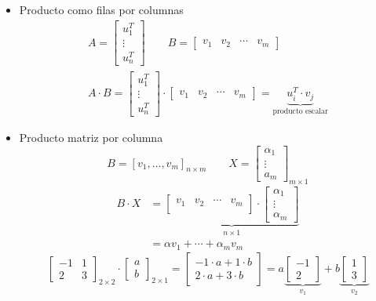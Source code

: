 \begin{itemize}[label=\color{lightblue}$-$, leftmargin=*]
	\item Producto como filas por columnas
	\[ \begin{array}{l}
		A= \begin{bmatrix}
		u_1^T\\
		\vdots\\
		u_n^T
	\end{bmatrix}\qquad B=\begin{bmatrix}
	v_1 & v_2 & \cdots & v_m
	\end{bmatrix}\\
	A\cdot B=\begin{bmatrix}
		u_1^T\\
		\vdots\\
		u_n^T
	\end{bmatrix}\cdot\begin{bmatrix}
	v_1 & v_2 & \cdots & v_m
	\end{bmatrix}=\underbrace{u_i^T\cdot v_j}_{\text{producto escalar}}
	\end{array}\]
	\item Producto matriz por columna
	\[ B=[v_1,\dots,v_m]_{n\times m}\qquad X=\begin{bmatrix}
		\alpha_1\\
		\vdots\\
		a_{m}
	\end{bmatrix}_{m\times 1} \]
	\[ \begin{aligned}
		B\cdot X & =\underbrace{
				 \begin{bmatrix}
				 	v_1 & v_2 & \cdots & v_m\\
				 \end{bmatrix}
				 \cdot\begin{bmatrix}
			\alpha_1\\
			\vdots\\
			\alpha_m
		\end{bmatrix}}_{n\times 1}\\
	& =\alpha v_1+\cdots+\alpha_mv_m
	\end{aligned} \]
	\[ \begin{bmatrix}
		-1 & 1\\
		2 & 3
	\end{bmatrix}_{2\times2}\cdot\begin{bmatrix}
	a\\
	b
	\end{bmatrix}_{2\times1}=\begin{bmatrix}
	-1\cdot a+1\cdot b\\
	2\cdot a+3\cdot b
	\end{bmatrix}=a\underbrace{\begin{bmatrix}
		-1\\
		2
		\end{bmatrix}}_{v_1}+b\underbrace{\begin{bmatrix}
		1\\
		3
	\end{bmatrix}}_{v_2} \]


\end{itemize}
